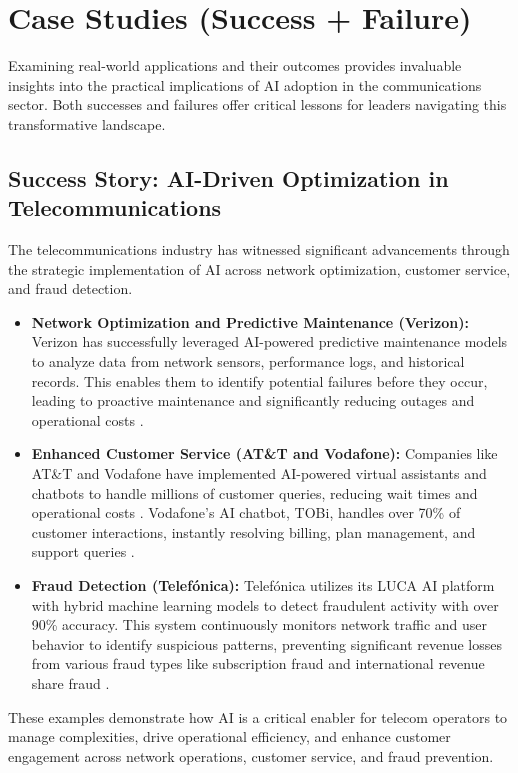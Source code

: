 \section{Case Studies (Success + Failure)}

Examining real-world applications and their outcomes provides invaluable insights into the practical implications of AI adoption in the communications sector. Both successes and failures offer critical lessons for leaders navigating this transformative landscape.

\subsection{Success Story: AI-Driven Optimization in Telecommunications}
The telecommunications industry has witnessed significant advancements through the strategic implementation of AI across network optimization, customer service, and fraud detection.
\begin{itemize}
    \item \textbf{Network Optimization and Predictive Maintenance (Verizon):} Verizon has successfully leveraged AI-powered predictive maintenance models to analyze data from network sensors, performance logs, and historical records. This enables them to identify potential failures before they occur, leading to proactive maintenance and significantly reducing outages and operational costs \cite{DigitalDefynd_Success_1, DigitalDefynd_Success_2}.
    \item \textbf{Enhanced Customer Service (AT\&T and Vodafone):} Companies like AT\&T and Vodafone have implemented AI-powered virtual assistants and chatbots to handle millions of customer queries, reducing wait times and operational costs \cite{SmartDev_Success, BoostAI_Success}. Vodafone's AI chatbot, TOBi, handles over 70\% of customer interactions, instantly resolving billing, plan management, and support queries \cite{SmartDev_Success}.
    \item \textbf{Fraud Detection (Telefónica):} Telefónica utilizes its LUCA AI platform with hybrid machine learning models to detect fraudulent activity with over 90\% accuracy. This system continuously monitors network traffic and user behavior to identify suspicious patterns, preventing significant revenue losses from various fraud types like subscription fraud and international revenue share fraud \cite{STLPartners_Success, Applligent_Success}.
\end{itemize}
These examples demonstrate how AI is a critical enabler for telecom operators to manage complexities, drive operational efficiency, and enhance customer engagement across network operations, customer service, and fraud prevention.

